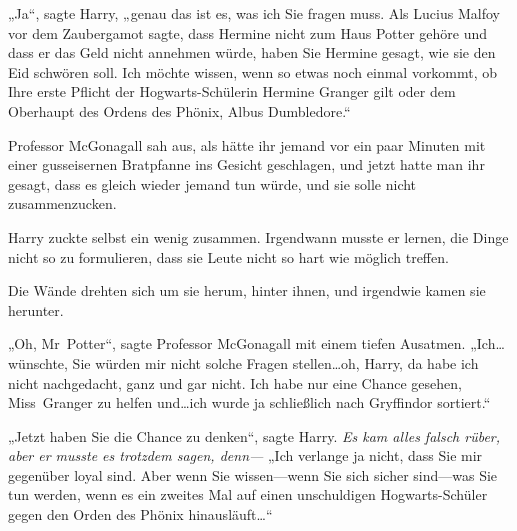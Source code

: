 „Ja“, sagte Harry, „genau das ist es, was ich Sie fragen muss. Als Lucius Malfoy vor dem Zaubergamot sagte, dass Hermine nicht zum Haus Potter gehöre und dass er das Geld nicht annehmen würde, haben Sie Hermine gesagt, wie sie den Eid schwören soll. Ich möchte wissen, wenn so etwas noch einmal vorkommt, ob Ihre erste Pflicht der Hogwarts-Schülerin Hermine Granger gilt oder dem Oberhaupt des Ordens des Phönix, Albus Dumbledore.“

Professor McGonagall sah aus, als hätte ihr jemand vor ein paar Minuten mit einer gusseisernen Bratpfanne ins Gesicht geschlagen, und jetzt hatte man ihr gesagt, dass es gleich wieder jemand tun würde, und sie solle nicht zusammenzucken.

Harry zuckte selbst ein wenig zusammen. Irgendwann musste er lernen, die Dinge nicht so zu formulieren, dass sie Leute nicht so hart wie möglich treffen.

Die Wände drehten sich um sie herum, hinter ihnen, und irgendwie kamen sie herunter.

„Oh, Mr~Potter“, sagte Professor McGonagall mit einem tiefen Ausatmen. „Ich…wünschte, Sie würden mir nicht solche Fragen stellen…oh, Harry, da habe ich nicht nachgedacht, ganz und gar nicht. Ich habe nur eine Chance gesehen, Miss~Granger zu helfen und…ich wurde ja schließlich nach Gryffindor sortiert.“

„Jetzt haben Sie die Chance zu denken“, sagte Harry. \emph{Es kam alles falsch rüber, aber er musste es trotzdem sagen, denn—} „Ich verlange ja nicht, dass Sie mir gegenüber loyal sind. Aber wenn Sie wissen—wenn Sie sich sicher sind—was Sie tun werden, wenn es ein zweites Mal auf einen unschuldigen Hogwarts-Schüler gegen den Orden des Phönix hinausläuft…“

